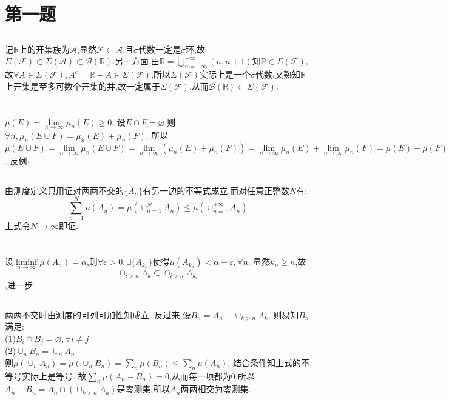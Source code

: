 \documentclass{ctexart}
\begin{document}
	\section{第一题}
	\subsection{}
	记$\mathbb{R}$上的开集族为$\mathcal{A}$,显然$\mathcal{F}\subset\mathcal{A}$,且$\sigma$代数一定是$\sigma$环,故$\Sigma(\mathcal{F})\subset\Sigma(\mathcal{A})\subset\mathcal{B}(\mathbb{R})$.另一方面,由$\mathbb{R}=\bigcup_{n=-\infty}^{+\infty}(n,n+1)$知$\mathbb{R}\in\Sigma(\mathcal{F})$,故$\forall A\in\Sigma(\mathcal{F}),A^c=\mathbb{R}-A\in\Sigma(\mathcal{F})$,所以$\Sigma(\mathcal{F})$实际上是一个$\sigma$代数.又熟知$\mathbb{R}$上开集是至多可数个开集的并,故一定属于$\Sigma(\mathcal{F})$,从而$\mathcal{B}(\mathbb{R})\subset\Sigma(\mathcal{F})$.
	\subsection{}
\section{}
\subsection{}
$\mu(E)=\lim\limits_{n\rightarrow\infty}\mu_n(E)\geq0$.
设$E\cap F=\varnothing$,则$\forall n,\mu_n(E\cup F)=\mu_n(E)+\mu_n(F)$.
所以$\mu(E\cup F)=\lim\limits_{n\rightarrow\infty}\mu_n(E\cup F)=\lim\limits_{n\rightarrow\infty}(\mu_n(E)+\mu_n(F))=\lim\limits_{n\rightarrow\infty}\mu_n(E)+\lim\limits_{n\rightarrow\infty}\mu_n(F)=\mu(E)+\mu(F)$.
反例:
\subsection{}
由测度定义只用证对两两不交的$\{A_n\}$有另一边的不等式成立.而对任意正整数$N$有:
$$\sum_{n=1}^{N}\mu(A_n)=\mu(\cup_{n=1}^NA_n)\leq \mu(\cup_{n=1}^{+\infty}A_n)$$
上式令$N\rightarrow \infty$即证.
\section{}
设$\liminf\limits_{n\rightarrow\infty}\mu(A_n)=\alpha$,则$\forall \varepsilon>0,\exists \{A_{k_n}\}$使得$\mu(A_{k_n})< \alpha+\varepsilon,\forall n$.
显然$k_n\geq n$,故$$\cap_{i>n}A_k\subset\cap_{i>n}A_{k_i}$$,进一步
\subsection{}
两两不交时由测度的可列可加性知成立.
反过来,设$B_n=A_n-\cup_{k>n}A_k$,
则易知$B_n$满足:\\
(1)$B_i\cap B_j=\varnothing,\forall i\neq j$\\
(2)$\cup_nB_n=\cup_nA_n$\\
则$\mu(\cup_nA_n)=\mu(\cup_nB_n)=\sum_n\mu(B_n)\leq\sum_n\mu(A_n)$,
结合条件知上式的不等号实际上是等号.
故$\sum_n\mu(A_n-B_n)=0$,从而每一项都为0.所以$A_n-B_n=A_n\cap (\cup_{k>n}A_k)$是零测集,所以${A_n}$两两相交为零测集.
\end{document}
